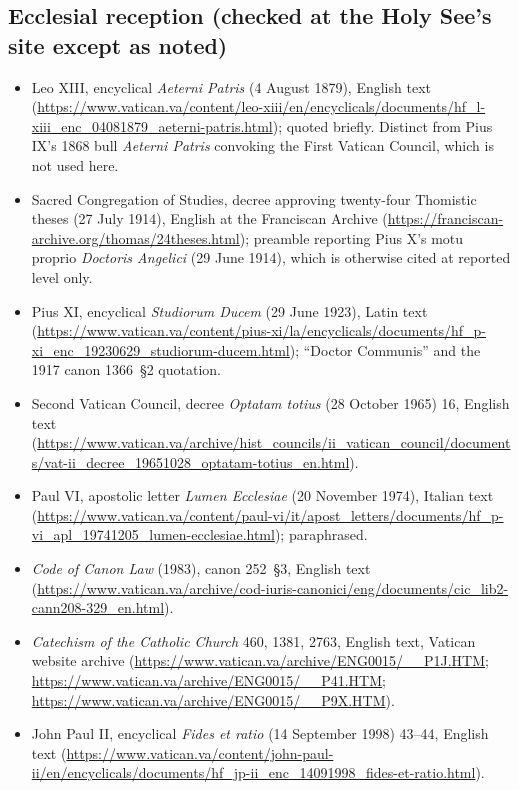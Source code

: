 \subsection*{Ecclesial reception (checked at the Holy See's site except
as noted)}

\begin{itemize}
\item Leo XIII, encyclical \textit{Aeterni Patris} (4 August 1879),
English text
(\url{https://www.vatican.va/content/leo-xiii/en/encyclicals/documents/hf_l-xiii_enc_04081879_aeterni-patris.html});
quoted briefly. Distinct from Pius IX's 1868 bull \textit{Aeterni
Patris} convoking the First Vatican Council, which is not used here.
\item Sacred Congregation of Studies, decree approving twenty-four
Thomistic theses (27 July 1914), English at the Franciscan Archive
(\url{https://franciscan-archive.org/thomas/24theses.html}); preamble
reporting Pius X's motu proprio \textit{Doctoris Angelici} (29 June
1914), which is otherwise cited at reported level only.
\item Pius XI, encyclical \textit{Studiorum Ducem} (29 June 1923), Latin
text
(\url{https://www.vatican.va/content/pius-xi/la/encyclicals/documents/hf_p-xi_enc_19230629_studiorum-ducem.html});
``Doctor Communis'' and the 1917 canon 1366~\S2 quotation.
\item Second Vatican Council, decree \textit{Optatam totius} (28 October
1965) 16, English text
(\url{https://www.vatican.va/archive/hist_councils/ii_vatican_council/documents/vat-ii_decree_19651028_optatam-totius_en.html}).
\item Paul VI, apostolic letter \textit{Lumen Ecclesiae} (20 November
1974), Italian text
(\url{https://www.vatican.va/content/paul-vi/it/apost_letters/documents/hf_p-vi_apl_19741205_lumen-ecclesiae.html});
paraphrased.
\item \textit{Code of Canon Law} (1983), canon 252~\S3, English text
(\url{https://www.vatican.va/archive/cod-iuris-canonici/eng/documents/cic_lib2-cann208-329_en.html}).
\item \textit{Catechism of the Catholic Church} 460, 1381, 2763, English
text, Vatican website archive
(\url{https://www.vatican.va/archive/ENG0015/__P1J.HTM};
\url{https://www.vatican.va/archive/ENG0015/__P41.HTM};
\url{https://www.vatican.va/archive/ENG0015/__P9X.HTM}).
\item John Paul II, encyclical \textit{Fides et ratio} (14 September
1998) 43--44, English text
(\url{https://www.vatican.va/content/john-paul-ii/en/encyclicals/documents/hf_jp-ii_enc_14091998_fides-et-ratio.html}).

\end{itemize}
